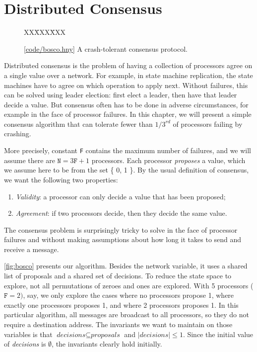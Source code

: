 \documentclass{report}
\newcommand{\harmonysource}[1]{
\begin{tabbing}
XX\=XXX\=XXX\kill
    
\end{tabbing}
}
\newcommand{\harmonylink}[1]{%
[\href{https://harmony.cs.cornell.edu/#1}{\underline{#1}}]%
}
\newenvironment{code}{
\tcolorbox
}{
\endtcolorbox
}
\begin{document}
\chapter{Distributed Consensus}
\label{ch:consensus}

\begin{figure}
\begin{code}
\harmonysource{bosco}
\end{code}
\caption{\harmonylink{code/bosco.hny} A crash-tolerant consensus protocol.}
\label{fig:bosco}
\end{figure}

Distributed consensus is the problem of having a collection of processors agree
on a single value over a network.
For example, in state machine replication, the state machines have to agree
on which operation to apply next.
Without failures, this can be solved using leader election: first elect a leader, then have that leader decide a value.
But consensus often has to be done in adverse circumstances,
for example in the face of processor failures.
In this chapter, we will present a simple consensus algorithm that can tolerate
fewer than $1/3^{rd}$ of processors failing by crashing.

More precisely,
constant \texttt{F} contains the maximum number of failures, and
we will assume there are $\texttt{N} = 3\texttt{F} + 1$ processors.
Each processor \emph{proposes} a value, which we assume here to be from the
set \{ 0, 1 \}.
By the usual definition of consensus, we want the following two properties:
\begin{enumerate}
\item \emph{Validity}: a processor can only decide a value that has been proposed;
\item \emph{Agreement}: if two processors decide, then they decide the same value.
\end{enumerate}
The consensus problem is surprisingly tricky to solve in the face of processor
failures and without making assumptions about how long it takes to send
and receive a message.

\autoref{fig:bosco} presents our algorithm.  Besides the network variable, it uses a
shared list of proposals and a shared set of decisions.
To reduce the state space to explore, not all permutations of zeroes and ones are
explored.  With 5 processors ($\mathtt{F} = 2)$, say, we only explore the cases where
no processors propose 1, where exactly one processors proposes 1, and where 2 processors
proposes 1.
In this particular algorithm, all messages are broadcast to all processors, so they do
not require a destination address.
The invariants we want to maintain
on those variables is that $\textit{decisions} \subseteq \textit{proposals}$
and $|\textit{decisions}| \leq 1$.  Since the initial value of \textit{decisions} is
$\emptyset$, the invariants clearly hold initially.
\end{document}
